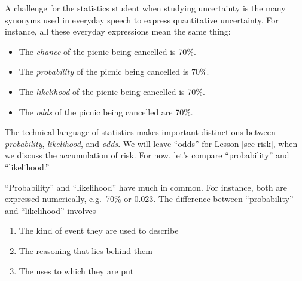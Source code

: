 \documentclass[
  letterpaper,
  DIV=11,
  numbers=noendperiod,
  oneside]{scrartcl}
\providecommand{\tightlist}{%
  \setlength{\itemsep}{0pt}\setlength{\parskip}{0pt}}\usepackage{longtable,booktabs,array}
\begin{document}
\begin{tcolorbox}[enhanced jigsaw, colbacktitle=quarto-callout-note-color!10!white, opacityback=0, breakable, opacitybacktitle=0.6, colback=white, coltitle=black, arc=.35mm, title=\textcolor{quarto-callout-note-color}{\faInfo}\hspace{0.5em}{Distinguishing between ``probability'' and ``likelihood''}, left=2mm, colframe=quarto-callout-note-color-frame, rightrule=.15mm, bottomrule=.15mm, leftrule=.75mm, bottomtitle=1mm, toptitle=1mm, titlerule=0mm, toprule=.15mm]

A challenge for the statistics student when studying uncertainty is the
many synonyms used in everyday speech to express quantitative
uncertainty. For instance, all these everyday expressions mean the same
thing:

\begin{itemize}
\tightlist
\item
  The \emph{chance} of the picnic being cancelled is 70\%.
\item
  The \emph{probability} of the picnic being cancelled is 70\%.
\item
  The \emph{likelihood} of the picnic being cancelled is 70\%.
\item
  The \emph{odds} of the picnic being cancelled are 70\%.
  {}
\end{itemize}

The technical language of statistics makes important distinctions
between \emph{probability}, \emph{likelihood}, and \emph{odds}. We will
leave ``odds'' for Lesson \ref{sec-risk}, when we discuss the
accumulation of risk. For now, let's compare ``probability'' and
``likelihood.''

``Probability'' and ``likelihood'' have much in common. For instance,
both are expressed numerically, e.g.~70\% or 0.023. The difference
between ``probability'' and ``likelihood'' involves

\begin{enumerate}
\def\labelenumi{\arabic{enumi}.}
\tightlist
\item
  The kind of event they are used to describe
\item
  The reasoning that lies behind them
\item
  The uses to which they are put
\end{enumerate}


\end{tcolorbox}
\end{document}
